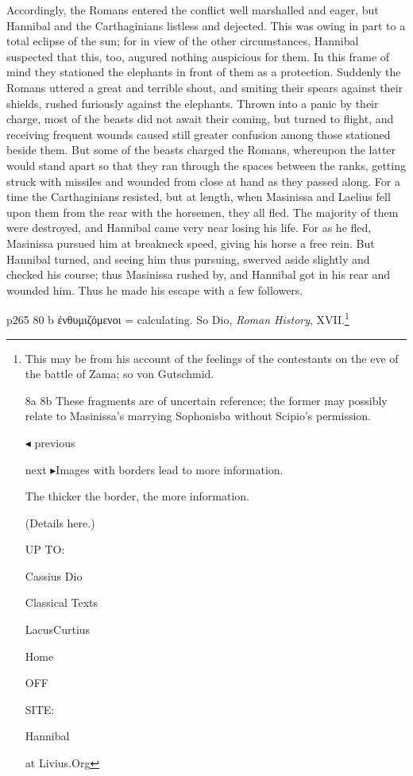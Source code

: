 Accordingly, the Romans entered the conflict well marshalled and eager, but Hannibal and the Carthaginians listless and dejected. This was owing in part to a total eclipse of the sun; for in view of the other circumstances, Hannibal suspected that this, too, augured nothing auspicious for them. In this frame of mind they stationed the elephants in front of them as a protection. Suddenly the Romans uttered a great and terrible shout, and smiting their spears against their shields, rushed furiously against the elephants. Thrown into a panic by their charge, most of the beasts did not await their coming, but turned to flight, and receiving frequent wounds caused still greater confusion among those stationed beside them. But some of the beasts charged the Romans, whereupon the latter would stand apart so that they ran through the spaces between the ranks, getting struck with missiles and wounded from close at hand as they passed along. For a time the Carthaginians resisted, but at length, when Masinissa and Laelius fell upon them from the rear with the horsemen, they all fled. The majority of them were destroyed, and Hannibal came very near losing his life. For as he fled, Masinissa pursued him at breakneck speed, giving his horse a free rein. But Hannibal turned, and seeing him thus pursuing, swerved aside slightly and checked his course; thus Masinissa rushed by, and Hannibal got in his rear and wounded him. Thus he made his escape with a few followers.

p265
80 b
\textgreek{\texthebrew{ἐ}νθυμιζόμενοι} = calculating. So Dio, \emph{Roman History}, XVII.\footnote{This may be from his account of the feelings of the contestants on the eve of the battle of Zama; so von Gutschmid.



8a
8b
These fragments are of uncertain reference; the former may possibly relate to Masinissa's marrying Sophonisba without Scipio's permission.

\texthebrew{◂} previous

next \texthebrew{▸}Images with borders lead to more information.

The thicker the border, the more information.

(Details here.)

UP TO:

Cassius Dio

Classical Texts

LacusCurtius

Home

OFF

SITE:

Hannibal

at Livius.Org}

